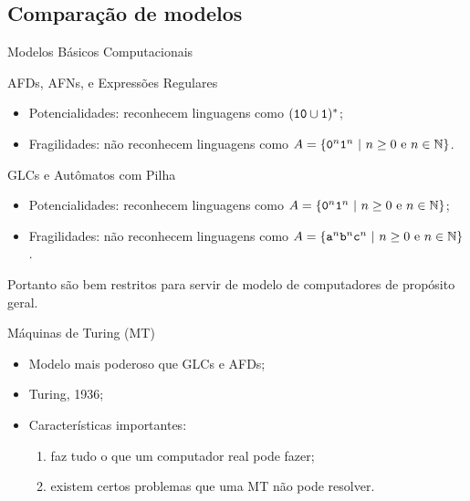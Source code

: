 \documentclass[xcolor=dvipsnames,table]{beamer}
\begin{document}
	\subsection{Comparação de modelos}
	\begin{frame}{Modelos Básicos Computacionais}
		\begin{block}{AFDs, AFNs, e Expressões Regulares}
			\begin{itemize}
				\item Potencialidades: reconhecem linguagens como $({\tt 10} \cup {\tt 1})^*$;
				\item Fragilidades: não reconhecem linguagens como $A = \{ {\tt 0}^n {\tt 1}^n \mbox{ | } n \geq 0 \mbox{ e } n \in \mathbb{N} \}$.
			\end{itemize}
		\end{block} 
		\begin{block}{GLCs e Autômatos com Pilha}
			\begin{itemize}
				\item Potencialidades: reconhecem linguagens como $A = \{ {\tt 0}^n {\tt 1}^n \mbox{ | } n \geq 0 \mbox{ e } n \in \mathbb{N} \}$;
				\item Fragilidades: não reconhecem linguagens como $A = \{ {\tt a}^n {\tt b}^n {\tt c}^n\mbox{ | } n \geq 0 \mbox{ e } n \in \mathbb{N} \}$.
			\end{itemize}
		\end{block} 
		\begin{alertblock}{}
			Portanto são bem restritos para servir de modelo de computadores de propósito geral.
		\end{alertblock}
	\end{frame}
	
	\begin{frame}{Máquinas de Turing (MT)}
		\begin{itemize}
			\item Modelo mais poderoso que GLCs e AFDs; 
			\item Turing, 1936; 
			\item Características importantes:
				\begin{enumerate}
					\item faz tudo o que um computador real pode fazer;
					\item existem certos problemas que uma MT não pode resolver.
				\end{enumerate}				 
		\end{itemize}
	\end{frame}
\end{document}
